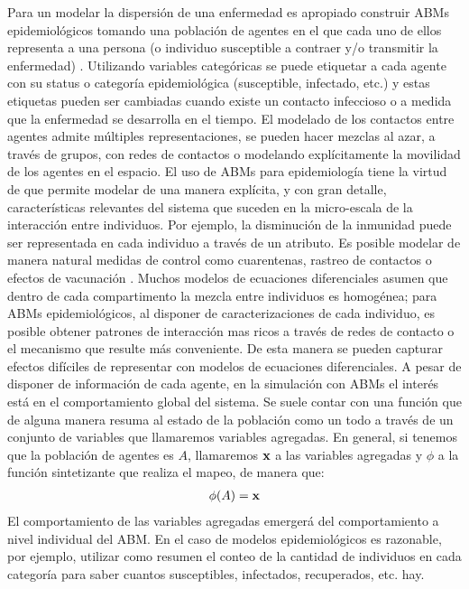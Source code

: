Para un modelar la dispersión de una enfermedad es apropiado construir ABMs epidemiológicos tomando una población de agentes en el que cada uno de ellos representa a una persona (o individuo susceptible a contraer y/o transmitir la enfermedad) \citep{Roche2011}. Utilizando variables categóricas se puede etiquetar a cada agente con su status o categoría epidemiológica (susceptible, infectado, etc.) y estas etiquetas pueden ser cambiadas cuando existe un contacto infeccioso o a medida que la enfermedad se desarrolla en el tiempo. El modelado de los contactos entre agentes admite múltiples representaciones, se pueden hacer mezclas al azar, a través de grupos, con redes de contactos o modelando explícitamente la movilidad de los agentes en el espacio. El uso de ABMs para epidemiología tiene la virtud de que permite modelar de una manera explícita, y con gran detalle, características relevantes del sistema que suceden en la micro-escala de la interacción entre individuos. Por ejemplo, la disminución de la inmunidad puede ser representada en cada individuo a través de un atributo. Es posible modelar de manera natural medidas de control como cuarentenas, rastreo de contactos o efectos de vacunación \cite{Silva2020}. Muchos modelos de ecuaciones diferenciales asumen que dentro de cada compartimento la mezcla entre individuos es homogénea; para ABMs epidemiológicos, al disponer de caracterizaciones de cada individuo, es posible obtener patrones de interacción mas ricos a través de redes de contacto o el mecanismo que resulte más conveniente. De esta manera se pueden capturar efectos difíciles de representar con modelos de ecuaciones diferenciales. A pesar de disponer de información de cada agente, en la simulación con ABMs el interés está en el comportamiento global del sistema. Se suele contar con una función que de alguna manera resuma al estado de la población como un todo a través de un conjunto de variables que llamaremos variables agregadas. En general, si tenemos que la población de agentes es $A$, llamaremos $\mathbf{x}$ a las variables agregadas y $\phi$ a la función sintetizante que realiza el mapeo, de manera que:
\begin{align}
    \phi (A) = \mathbf{x}
\end{align}
El comportamiento de las variables agregadas emergerá del comportamiento a nivel individual del ABM. En el caso de modelos epidemiológicos es razonable, por ejemplo, utilizar como resumen el conteo de la cantidad de individuos en cada categoría para saber cuantos susceptibles, infectados, recuperados, etc. hay.

